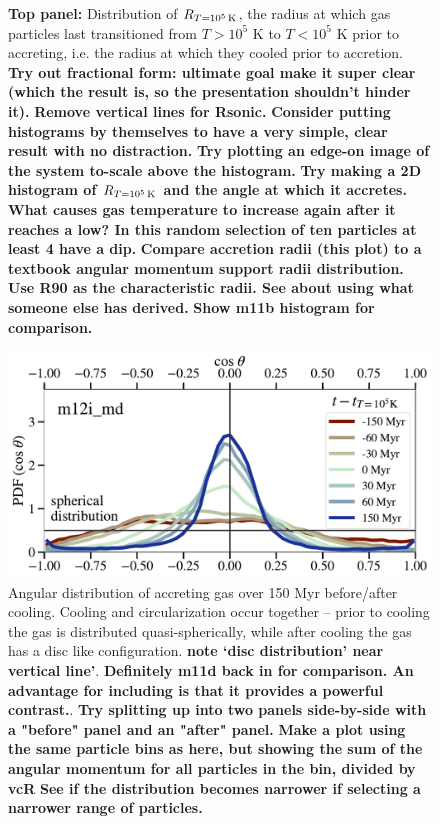 \documentclass[fleqn,usenatbib]{mnras}
\newcommand{\Rcon}{R_{T=10^5\,{\rm K}}}
\begin{document}
\begin{figure}
{    \textbf{Top panel:} Distribution of $\Rcon$, the radius at which gas particles last transitioned from $T > 10^5$ K to $T < 10^5$ K prior to accreting, i.e. the radius at which they cooled prior to accretion.
    \textbf{Try out fractional form: ultimate goal make it super clear (which the result is, so the presentation shouldn't hinder it).}
    \textbf{Remove vertical lines for Rsonic.}
    \textbf{Consider putting histograms by themselves to have a very simple, clear result with no distraction.}
    \textbf{
    Try plotting an edge-on image of the system to-scale above the histogram.
    }
    \textbf{
    Try making a 2D histogram of $\Rcon$ and the angle at which it accretes.
    }
    \textbf{
    What causes gas temperature to increase again after it reaches a low?
    In this random selection of ten particles at least 4 have a dip.
    }
 \textbf{Compare accretion radii (this plot) to a textbook angular momentum support radii distribution.}
 \textbf{Use R90 as the characteristic radii. See about using what someone else has derived.}
 \textbf{Show m11b histogram for comparison.}
    }
    \label{f: T vs R}
\end{figure}

\begin{figure}
    \centering
    \includegraphics[width=\columnwidth]{figures/theta_vs_t.pdf}
    \caption{
    Angular distribution of accreting gas over 150 Myr before/after cooling. Cooling and circularization occur together -- prior to cooling the gas is distributed quasi-spherically, while after cooling the gas has a disc like configuration.
    \textbf{note `disc distribution' near vertical line'}.
    \textbf{Definitely m11d back in for comparison. An advantage for including is that it provides a powerful contrast.}.
    \textbf{Try splitting up into two panels side-by-side with a "before" panel and an "after" panel.}
    \textbf{Make a plot using the same particle bins as here, but showing the sum of the angular momentum for all particles in the bin, divided by vcR}
    \textbf{See if the distribution becomes narrower if selecting a narrower range of particles.}
    }
    \label{f: theta vs t}
\end{figure}
\end{document}
